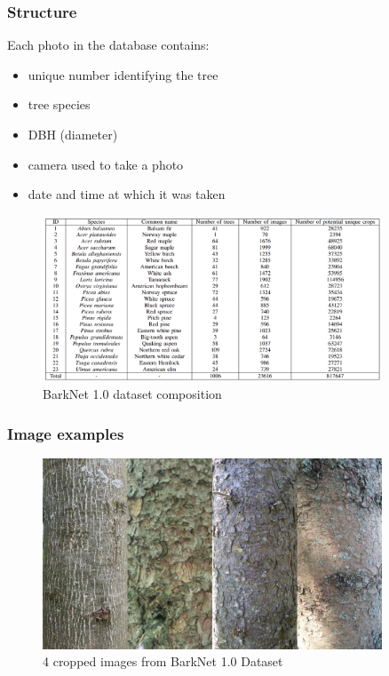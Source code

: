 \documentclass[../Main.tex]{subfiles}
\begin{document}
    \subsubsection{Structure}
    Each photo in the database contains:
    \begin{itemize}
        \item unique number identifying the tree
        \item tree species
        \item DBH (diameter)
        \item camera used to take a photo
        \item date and time at which it was taken 
    \end{itemize}

    \begin{figure}[H]
        \centering
        \includegraphics[width=0.9\textwidth]{Images/datasets/04_treebark_table.png}
        \caption{BarkNet 1.0 dataset composition \cite{treebark2018}}
        \label{fig:plantnet-voting}
    \end{figure}
    
    \subsubsection{Image examples}
    
    \begin{figure}[ht]
        \centering
        \includegraphics[width=0.9\textwidth]{Images/datasets/04_treebark_combined.jpg}
        \caption{4 cropped images from BarkNet 1.0 Dataset \cite{treebark2018}}
            \label{fig:04_treebark_combined}
    \end{figure}
    
\end{document}
